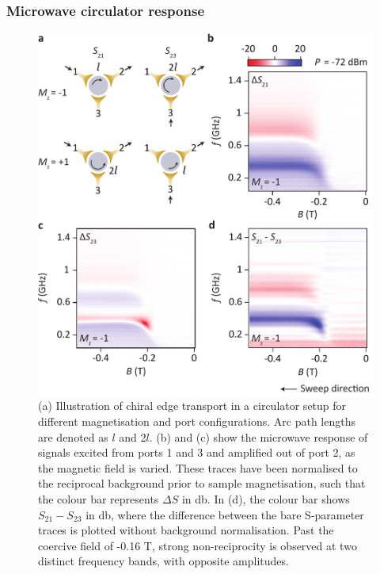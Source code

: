 \subsubsection{Microwave circulator response}
\begin{figure}
\includegraphics[width=\columnwidth]{Fig2_TI}
\caption[Microwave transmission measurement of 3D-TI based circulator]{\label{fig:fig2_ti}(a) Illustration of chiral edge transport in a circulator setup for different magnetisation and port configurations. Arc path lengths are denoted as $l$ and 2$l$. (b) and (c) show the microwave response of signals excited from ports 1 and 3 and amplified out of port 2, as the  magnetic field is varied. These traces have been normalised to the reciprocal background prior to sample magnetisation, such that the colour bar represents $\Delta S$ in \si{\decibel}. In (d), the colour bar shows $S_{21} - S_{23}$ in \si{\decibel}, where the difference between the bare S-parameter traces is plotted without background normalisation. Past the coercive field of -0.16 T, strong non-reciprocity is observed at two distinct frequency bands, with opposite amplitudes.}
\end{figure}
